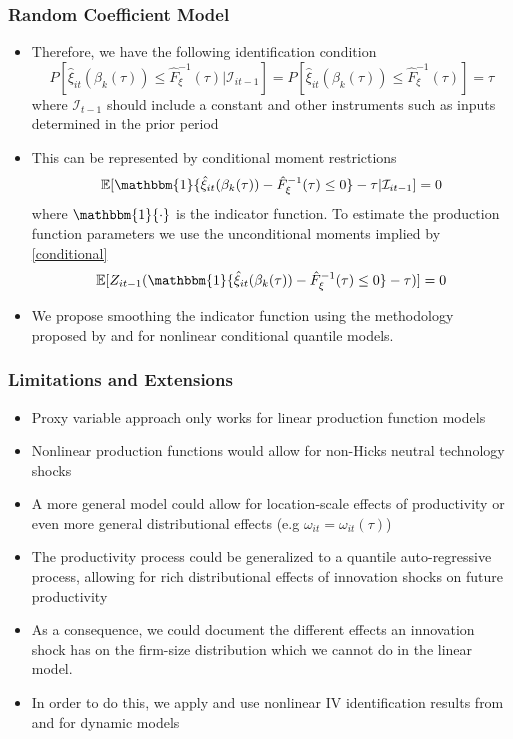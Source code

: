 \documentclass{beamer}
\begin{document}
\begin{frame}
\frametitle{Random Coefficient Model}
\begin{itemize}
	\item Therefore, we have the following identification condition
		\begin{equation}
		P[\hat{\xi}_{it}(\beta_{k}(\tau))\leq \hat{F}_{\xi}^{-1}(\tau)|\mathcal{I}_{it-1}]=P[\hat{\xi}_{it}(\beta_{k}(\tau))\leq \hat{F}_{\xi}^{-1}(\tau)]=\tau
		\end{equation}
		where $\mathcal{I}_{t-1}$ should include a constant and other instruments such as inputs determined in the prior period
	\item This can be represented by conditional moment restrictions
		\begin{equation} \label{conditional}
			\mathbb{E}[\mathbbm{1}\{\hat{\xi}_{it}(\beta_{k}(\tau))- \hat{F}_{\xi}^{-1}(\tau)\leq 0\}-\tau|\mathcal{I}_{it-1}]=0
		\end{equation}
		where $\mathbbm{1}\{\cdot\}$ is the indicator function. To estimate the production function parameters we use the unconditional moments implied by \eqref{conditional}
		\begin{equation}
			\mathbb{E}[Z_{it-1}(\mathbbm{1}\{\hat{\xi}_{it}(\beta_{k}(\tau))- \hat{F}_{\xi}^{-1}(\tau)\leq 0\}-\tau)]=0
		\end{equation}
		\item We propose smoothing the indicator function using the methodology proposed by \cite{Kaplan2016} and \cite{qgmm}  for nonlinear conditional quantile models.
\end{itemize}
\end{frame}


\begin{frame}
\frametitle{Limitations and Extensions}
\begin{itemize}
	\item Proxy variable approach only works for linear production function models
	\item Nonlinear production functions would allow for non-Hicks neutral technology shocks
	\item A more general model could allow for location-scale effects of productivity or even more general distributional effects (e.g $\omega_{it}=\omega_{it}(\tau)$)
	\item The productivity process could be generalized to a quantile auto-regressive process, allowing for rich distributional effects of innovation shocks on future productivity
	\item As a consequence, we could document the different effects an innovation shock has on the firm-size distribution which we cannot do in the linear model.
	\item In order to do this, we apply \cite{Arellano2016} and use nonlinear IV identification results from \cite{Hu2008} and \cite{Hu2012} for dynamic models
\end{itemize}
\end{frame}
\end{document}
